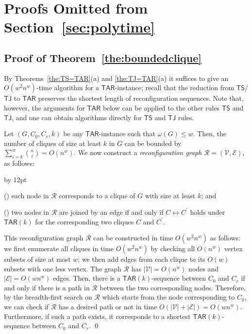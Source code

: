 \documentclass{llncs}
\newcommand{\onestep}{\leftrightarrow}
\newcommand{\TAR}[1]{\mathsf{TAR}(#1)}
\newcommand{\TS}{\mathsf{TS}}
\newcommand{\TJ}{\mathsf{TJ}}
\newcommand{\ini}{0}
\newcommand{\tar}{r}
\newcommand{\cliq}{C}
\newcommand{\TARrule}{\mathsf{TAR}}
\newcommand{\cgraph}{\mathcal{R}}
\newcommand{\cvertex}{\mathcal{V}}
\newcommand{\cedge}{\mathcal{E}}
\newenvironment{listing}[1]{\begin{list}{*}{\settowidth{\labelwidth}{#1}\setlength{\leftmargin}{\labelwidth}\advance \leftmargin by 12pt
\setlength{\itemsep}{0pt}\setlength{\parsep}{0pt}\setlength{\topsep}{0pt}\setlength{\parskip}{0pt}}}{\end{list}}
\newcounter{one}
\newcommand{\one}{{\rm \roman{one}}}
\newcounter{two}
\newcommand{\two}{{\rm \roman{two}}}
\begin{document}
	\section{Proofs Omitted from Section~\ref{sec:polytime}}
	
	\subsection{Proof of Theorem~\ref{the:boundedclique}}
By Theorems~\ref{the:TS=TAR}(a) and \ref{the:TJ=TAR}(a) it suffices to give an $O(w^{2} n^{w})$-time algorithm for a $\TARrule$-instance;
	recall that the reduction from $\TS$/$\TJ$ to $\TARrule$ preserves the shortest length of reconfiguration sequences.
	Note that, however, the arguments for $\TARrule$ below can be applied to the other rules $\TS$ and $\TJ$, and one can obtain algorithms directly for $\TS$ and $\TJ$ rules.

	Let $(G, \cliq_{\ini}, \cliq_{\tar}, k)$ be any $\TARrule$-instance such that $\omega(G) \le w$.
	Then, the number of cliques of size at least $k$ in $G$ can be bounded by $\sum_{i=k}^{w} {n \choose i} = O(n^w)$.
	We now construct a \textit{reconfiguration graph} $\cgraph = (\cvertex, \cedge)$, as follows: 
		\begin{listing}{aaa}
		\item[(\one)] each node in $\cgraph$ corresponds to a clique of $G$ with size at least $k$; and 
		\item[(\two)] two nodes in $\cgraph$ are joined by an edge if and only if $\cliq \onestep \cliq^\prime$ holds under $\TAR{k}$ for the corresponding two cliques $\cliq$ and $\cliq^\prime$.  
		\end{listing}
	This reconfiguration graph $\cgraph$ can be constructed in time $O(w^{2} n^{w})$ as follows:
	we first enumerate all cliques in time $O(w^{2} n^{w})$ by checking all $O(n^{w})$ vertex subsets of size at most $w$;
	we then add edges from each clique to its $O(w)$ subsets with one less vertex.
	The graph $\cgraph$ has $|\cvertex| = O(n^w)$ nodes and $|\cedge| = O(w n^w)$ edges. 
	Then, there is a $\TAR{k}$-sequence between $\cliq_{\ini}$ and $\cliq_{\tar}$ if and only if there is a path in $\cgraph$ between the two corresponding nodes. 
	Therefore, by the breadth-first search on $\cgraph$ which starts from the node corresponding to $\cliq_{\ini}$, we can check if $\cgraph$ has a desired path or not in time $O(|\cvertex| + |\cedge|) = O(w n^{w})$. 
	Furthermore, if such a path exists, it corresponds to a shortest $\TAR{k}$-sequence between $\cliq_{\ini}$ and $\cliq_{\tar}$. 
	\qed
\end{document}
